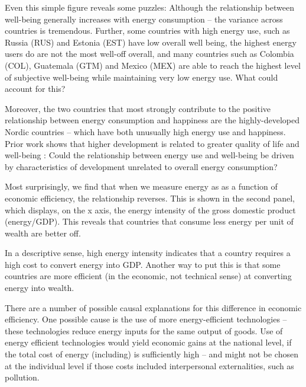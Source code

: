 \documentclass[10pt, letterpaper]{article}
\begin{document}
\begin{spacing}{1.4}
Even this simple figure reveals some puzzles: Although the relationship between
well-being generally increases with energy consumption -- the variance across
countries is tremendous. Further, some countries with high energy use, such as
Russia (RUS)  and Estonia (EST) have low overall well being, the highest energy
users do are not the most well-off overall, and many countries such as Colombia
(COL), Guatemala (GTM) and Mexico (MEX) are able to reach the highest level of subjective well-being while maintaining very low energy use. What could account for this? 

%

Moreover, the two countries that most strongly contribute to the positive relationship between energy consumption and happiness are the highly-developed Nordic countries -- which have both unusually high energy use and happiness. Prior work shows that higher development is related to greater quality of life and well-being \cite{mazur11}: Could the relationship between energy use and well-being be driven by characteristics of development unrelated to overall energy consumption?

%

Most surprisingly,  we find that when we measure energy as as a function of economic efficiency, the relationship reverses.  This is shown in the second panel, which displays, on the x axis, the energy intensity of the gross domestic product (energy/GDP). This reveals that countries that  consume less energy per unit of wealth are better off. 

In a descriptive sense, high energy intensity indicates that a country requires a high cost to convert energy into GDP. Another way to put this is that some countries are more efficient (in the economic, not technical sense) at converting energy into wealth. 

There are a number of possible causal explanations for this difference in economic efficiency. One possible cause is the use of more energy-efficient technologies -- these technologies reduce energy inputs for the same output of goods. Use of energy efficient technologies would yield economic gains at the national level, if the total cost of energy (including) is sufficiently high -- and might not be chosen at the individual level if those costs included interpersonal externalities, such as pollution. 


\end{spacing}
\end{document}
